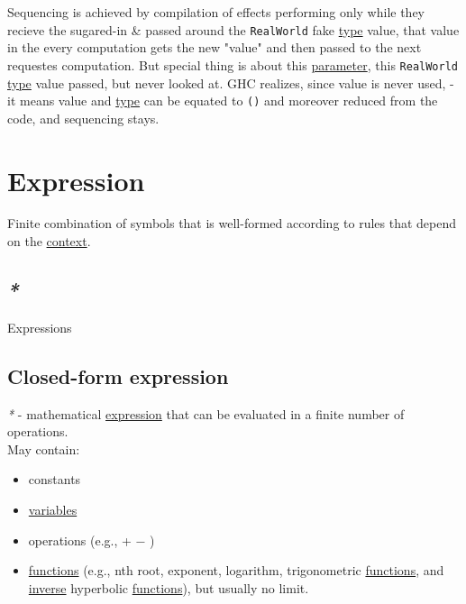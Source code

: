 \documentclass[a4paper,14pt,oneside]{book}
\begin{document}
Sequencing is achieved by compilation of effects performing only while they recieve the sugared-in \& passed around the \texttt{RealWorld} fake \hyperref[orgb064f4e]{type} value, that value in the every computation gets the new "value" and then passed to the next requestes computation. But special thing is about this \hyperref[orga55841e]{parameter}, this \texttt{RealWorld} \hyperref[orgb064f4e]{type} value passed, but never looked at. GHC realizes, since value is never used, - it means value and \hyperref[orgb064f4e]{type} can be equated to \texttt{()} and moreover reduced from the code, and sequencing stays.\\

\chapter{\label{orgc25ca10}Expression}
\label{sec:org47f85f3}
Finite combination of symbols that is well-formed according to rules that depend on the \hyperref[orgbfccf2e]{context}.\\

\section{\emph{*}}
\label{sec:org4cb9992}

\label{org99613d8}Expressions\\

\section{\label{org1af705f}Closed-form expression}
\label{sec:orgd53a5bb}
\emph{*} - mathematical \hyperref[orgc25ca10]{expression} that can be evaluated in a finite number of operations.\\

May contain:\\
\begin{itemize}
\item constants\\
\item \hyperref[org03ce465]{variables}\\
\item operations (e.g., + − \texttimes{} \textdiv{})\\
\item \hyperref[org50b1dc4]{functions} (e.g., nth root, exponent, logarithm, trigonometric \hyperref[org50b1dc4]{functions}, and \hyperref[org57a5140]{inverse} hyperbolic \hyperref[org50b1dc4]{functions}), but usually no limit.\\
\end{itemize}
\end{document}
